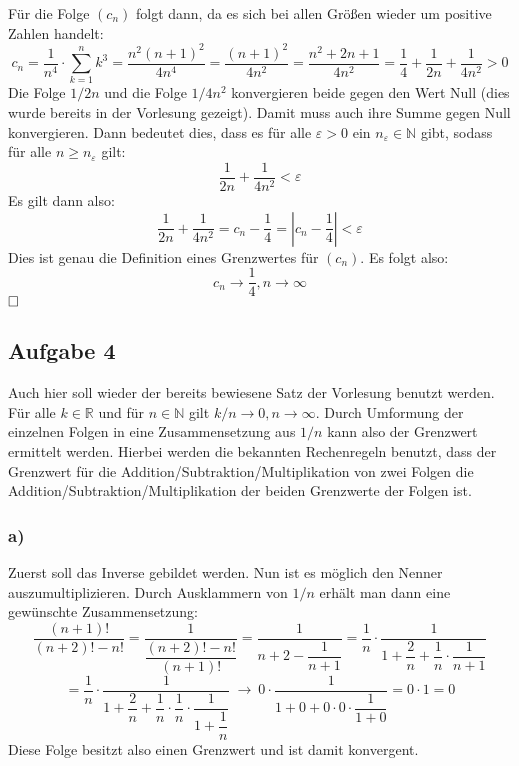 \documentclass[10pt, a4paper]{article}
\begin{document}
			Für die Folge $(c_n)$ folgt dann, da es sich bei allen Größen wieder um positive Zahlen handelt:
			\[
				c_n = \frac{1}{n^4}\cdot \sum_{k=1}^n k^3 = \dfrac{n^2(n+1)^2}{4n^4} = \dfrac{(n+1)^2}{4n^2} = \dfrac{n^2 + 2n + 1}{4n^2} = \dfrac{1}{4} + \dfrac{1}{2n} + \dfrac{1}{4n^2} > 0
			\]
			Die Folge $1/2n$ und die Folge $1/4n^2$ konvergieren beide gegen den Wert Null (dies wurde bereits in der Vorlesung gezeigt). Damit muss auch ihre Summe gegen Null konvergieren. Dann bedeutet dies, dass es für alle $\varepsilon > 0$ ein $n_{\varepsilon} \in \mathbb{N}$ gibt, sodass für alle $n \geq n_{\varepsilon}$ gilt:
			\[
				\dfrac{1}{2n} + \dfrac{1}{4n^2} < \varepsilon
			\]
			Es gilt dann also:
			\[
				\dfrac{1}{2n} + \dfrac{1}{4n^2} = c_n - \dfrac{1}{4} = \left| c_n -\dfrac{1}{4} \right| < \varepsilon
			\]
			Dies ist genau die Definition eines Grenzwertes für $(c_n)$. Es folgt also:
			\[
				c_n \longrightarrow \dfrac{1}{4}, n \longrightarrow \infty
			\]
			$\hfill\Box$

	
		\newpage



	\subsection*{Aufgabe 4} %
	\label{sub:aufgabe_4}

		Auch hier soll wieder der bereits bewiesene Satz der Vorlesung benutzt werden. Für alle $k \in \mathbb{R}$ und für $n \in \mathbb{N}$ gilt $k/n \rightarrow 0, n \rightarrow \infty$.
		Durch Umformung der einzelnen Folgen in eine Zusammensetzung aus $1/n$ kann also der Grenzwert ermittelt werden. Hierbei werden die bekannten Rechenregeln benutzt, dass der Grenzwert für die Addition/Subtraktion/Multiplikation von zwei Folgen die Addition/Subtraktion/Multiplikation der beiden Grenzwerte der Folgen ist.

		\subsubsection*{a)} %
		\label{ssub:a_}
			
			Zuerst soll das Inverse gebildet werden. Nun ist es möglich den Nenner auszumultiplizieren. Durch Ausklammern von $1/n$ erhält man dann eine gewünschte Zusammensetzung:
			\[
				\dfrac{(n+1)!}{(n+2)!-n!} = \dfrac{1}{\dfrac{(n+2)!-n!}{(n+1)!}} =  \dfrac{1}{n+2 - \dfrac{1}{n+1}} = \dfrac{1}{n}\cdot \dfrac{1}{1+\dfrac{2}{n} + \dfrac{1}{n}\cdot\dfrac{1}{n+1}}
			\]
			\[
				= \dfrac{1}{n}\cdot \dfrac{1}{1+\dfrac{2}{n} + \dfrac{1}{n}\cdot\dfrac{1}{n}\cdot \dfrac{1}{1+\dfrac{1}{n}}} \ \longrightarrow \ 0\cdot \dfrac{1}{1+0+0\cdot 0\cdot \dfrac{1}{1+0}} = 0\cdot 1 = 0
			\]
			Diese Folge besitzt also einen Grenzwert und ist damit konvergent.
\end{document}
